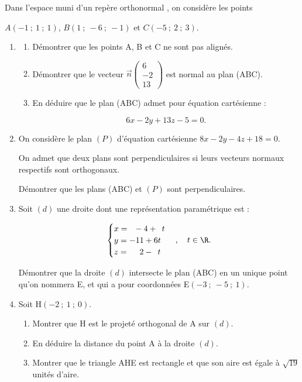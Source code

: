 Dans l'espace muni d'un repère orthonormal \Oijk, on considère les points 

$A(-1~;~1~;~1)$, $B(1~;~-6~;~-1)$ et $C(-5~;~2~;~3)$.

\medskip

\begin{enumerate}
\item[1.] 
	\begin{enumerate}[label=\alph*.]
		\item Démontrer que les points A, B et C ne sont pas alignés.
		\item Démontrer que le vecteur $\vec{n}\begin{pmatrix} 6 \\ -2 \\ 13 \end{pmatrix}$ est normal au plan (ABC).
		\item En déduire que le plan (ABC) admet pour équation cartésienne :

\[6x - 2y + 13z - 5 = 0.\]
	\end{enumerate}

\item On considère le plan $(P)$ d'équation cartésienne $8x - 2y - 4z + 18 = 0$.

On admet que deux plans sont perpendiculaires si leurs vecteurs normaux respectifs sont orthogonaux.

Démontrer que les plans (ABC) et $(P)$ sont perpendiculaires.
\item Soit $(d)$ une droite dont une représentation paramétrique est :

\[\begin{cases}
x = \phantom{1}-4 + \phantom{1}t \\
y = -11 + 6t \\
z = \phantom{-1}2 - \phantom{1}t
\end{cases}, \quad t \in \R.\]

Démontrer que la droite $(d)$ intersecte le plan (ABC) en un unique point qu'on nommera E, et qui a pour coordonnées E$(-3~;~-5~;~1)$.

\item[4.] Soit H$(-2~;~1~;~0)$.
	\begin{enumerate}[label=\alph*.]
		\item Montrer que H est le projeté orthogonal de A sur $(d)$.
		\item En déduire la distance du point A à la droite $(d)$.
		\item Montrer que le triangle AHE est rectangle et que son aire est égale à $\sqrt{19}$ unités d'aire.
	\end{enumerate}
\end{enumerate}

\bigskip
